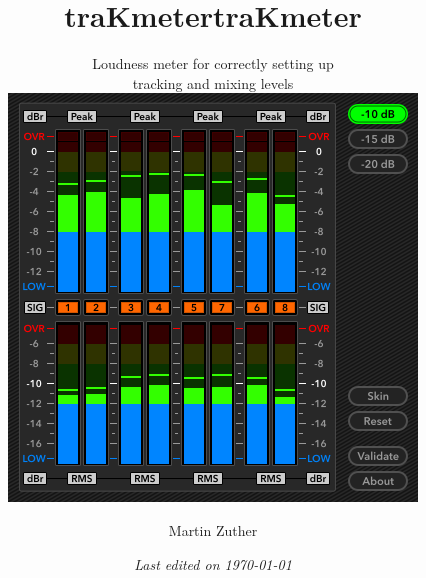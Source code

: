 


\title{traKmeter}
\author{Martin Zuther}



\title{traKmeter}

\subtitle{
  \normalsize{\textrm{\textmd{
        \vfill
        Loudness meter for correctly setting up \\
        tracking and mixing levels
        \vfill
        \vspace{1.5em}
        \includegraphics[scale=0.375,clip]{include/images/trakmeter.png}
        \vfill
      }}}
}

\author{}

\date{\emph{Last edited on \today}}


